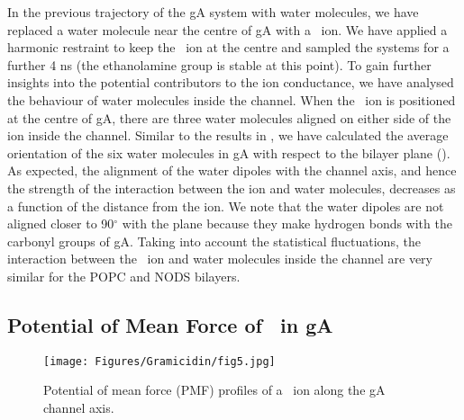 In the previous trajectory of the gA system with water molecules, we have replaced a water molecule 
near the centre of gA with a \K\ ion. We have applied a harmonic restraint to keep the \K\ ion at 
the centre and sampled the systems for a further 4 ns (the ethanolamine group is stable at this 
point). To gain further insights into the potential contributors to the ion conductance, we have 
analysed the behaviour of water molecules inside the channel. When the \K\ ion is positioned at 
the centre of gA, there are three water molecules aligned on either side of the ion inside the 
channel. Similar to the results in , we have calculated the average orientation of 
the six water molecules in gA with respect to the bilayer plane (). As expected, 
the alignment of the water dipoles with the channel axis, and hence the strength of the interaction 
between the ion and water molecules, decreases as a function of the distance from the ion. We note 
that the water dipoles are not aligned closer to 90$^{\circ}$ with the plane because they make 
hydrogen bonds with the carbonyl groups of gA. Taking into account the statistical fluctuations, 
the interaction between the \K\ ion and water molecules inside the channel are very similar for the 
POPC and NODS bilayers.

\subsection{Potential of Mean Force of \K\ in gA}
\begin{figure}[b!]
\centering
\texttt{[image: Figures/Gramicidin/fig5.jpg]}
\caption{Potential of mean force (PMF) profiles of a \K\ ion along the gA channel axis.}
\label{gA:fig5}
\end{figure}

